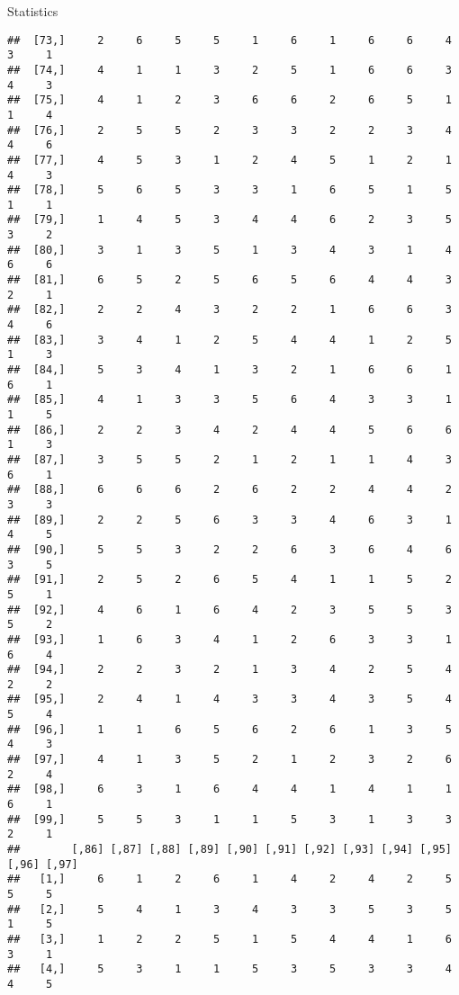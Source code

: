 \documentclass[
  ignorenonframetext,
]{beamer}
\begin{document}
\begin{frame}[fragile]{Statistics}
\begin{verbatim}
##  [73,]     2     6     5     5     1     6     1     6     6     4     3     1
##  [74,]     4     1     1     3     2     5     1     6     6     3     4     3
##  [75,]     4     1     2     3     6     6     2     6     5     1     1     4
##  [76,]     2     5     5     2     3     3     2     2     3     4     4     6
##  [77,]     4     5     3     1     2     4     5     1     2     1     4     3
##  [78,]     5     6     5     3     3     1     6     5     1     5     1     1
##  [79,]     1     4     5     3     4     4     6     2     3     5     3     2
##  [80,]     3     1     3     5     1     3     4     3     1     4     6     6
##  [81,]     6     5     2     5     6     5     6     4     4     3     2     1
##  [82,]     2     2     4     3     2     2     1     6     6     3     4     6
##  [83,]     3     4     1     2     5     4     4     1     2     5     1     3
##  [84,]     5     3     4     1     3     2     1     6     6     1     6     1
##  [85,]     4     1     3     3     5     6     4     3     3     1     1     5
##  [86,]     2     2     3     4     2     4     4     5     6     6     1     3
##  [87,]     3     5     5     2     1     2     1     1     4     3     6     1
##  [88,]     6     6     6     2     6     2     2     4     4     2     3     3
##  [89,]     2     2     5     6     3     3     4     6     3     1     4     5
##  [90,]     5     5     3     2     2     6     3     6     4     6     3     5
##  [91,]     2     5     2     6     5     4     1     1     5     2     5     1
##  [92,]     4     6     1     6     4     2     3     5     5     3     5     2
##  [93,]     1     6     3     4     1     2     6     3     3     1     6     4
##  [94,]     2     2     3     2     1     3     4     2     5     4     2     2
##  [95,]     2     4     1     4     3     3     4     3     5     4     5     4
##  [96,]     1     1     6     5     6     2     6     1     3     5     4     3
##  [97,]     4     1     3     5     2     1     2     3     2     6     2     4
##  [98,]     6     3     1     6     4     4     1     4     1     1     6     1
##  [99,]     5     5     3     1     1     5     3     1     3     3     2     1
##        [,86] [,87] [,88] [,89] [,90] [,91] [,92] [,93] [,94] [,95] [,96] [,97]
##   [1,]     6     1     2     6     1     4     2     4     2     5     5     5
##   [2,]     5     4     1     3     4     3     3     5     3     5     1     5
##   [3,]     1     2     2     5     1     5     4     4     1     6     3     1
##   [4,]     5     3     1     1     5     3     5     3     3     4     4     5

\end{verbatim}
\end{frame}
\end{document}
